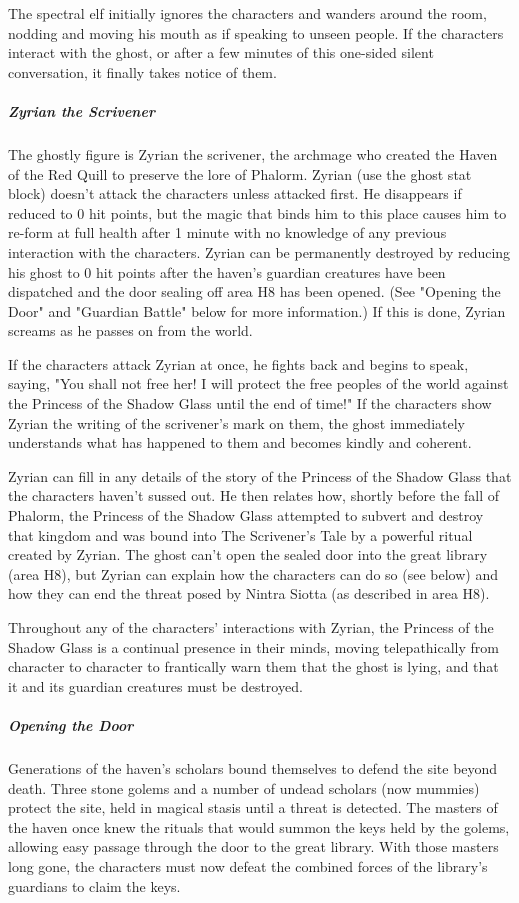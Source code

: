 \documentclass[10pt,a4paper,twoside,bg=print,twocolumn,openany,nodeprecatedcode]{dndbook}
\begin{document}
The spectral elf initially ignores the characters and wanders around the room, nodding and moving his mouth as if speaking to unseen people. If the characters interact with the ghost, or after a few minutes of this one-sided silent conversation, it finally takes notice of them.

\subparagraph{Zyrian the Scrivener}
The ghostly figure is Zyrian the scrivener, the archmage who created the Haven of the Red Quill to preserve the lore of Phalorm. Zyrian (use the ghost stat block) doesn't attack the characters unless attacked first. He disappears if reduced to 0 hit points, but the magic that binds him to this place causes him to re-form at full health after 1 minute with no knowledge of any previous interaction with the characters. Zyrian can be permanently destroyed by reducing his ghost to 0 hit points after the haven's guardian creatures have been dispatched and the door sealing off area H8 has been opened. (See "Opening the Door" and "Guardian Battle" below for more information.) If this is done, Zyrian screams as he passes on from the world.

If the characters attack Zyrian at once, he fights back and begins to speak, saying, "You shall not free her! I will protect the free peoples of the world against the Princess of the Shadow Glass until the end of time!" If the characters show Zyrian the writing of the scrivener's mark on them, the ghost immediately understands what has happened to them and becomes kindly and coherent.

Zyrian can fill in any details of the story of the Princess of the Shadow Glass that the characters haven't sussed out. He then relates how, shortly before the fall of Phalorm, the Princess of the Shadow Glass attempted to subvert and destroy that kingdom and was bound into The Scrivener's Tale by a powerful ritual created by Zyrian. The ghost can't open the sealed door into the great library (area H8), but Zyrian can explain how the characters can do so (see below) and how they can end the threat posed by Nintra Siotta (as described in area H8).

Throughout any of the characters' interactions with Zyrian, the Princess of the Shadow Glass is a continual presence in their minds, moving telepathically from character to character to frantically warn them that the ghost is lying, and that it and its guardian creatures must be destroyed.

\subparagraph{Opening the Door}
Generations of the haven's scholars bound themselves to defend the site beyond death. Three stone golems and a number of undead scholars (now mummies) protect the site, held in magical stasis until a threat is detected. The masters of the haven once knew the rituals that would summon the keys held by the golems, allowing easy passage through the door to the great library. With those masters long gone, the characters must now defeat the combined forces of the library's guardians to claim the keys.
\end{document}
